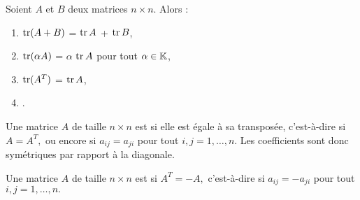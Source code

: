 \documentclass[10pt,class=article,crop=false]{standalone}
\begin{document}
\begin{multicols}{2}
\begin{theoreme}
	Soient $A$ et $B$ deux matrices $n \times n$. Alors :
	\begin{enumerate}
		\item $\operatorname{tr}(A + B)$ = $\operatorname{tr} A$ + $\operatorname{tr} B$,
		\item $\operatorname{tr}(\alpha A)$ = $\alpha$ $\operatorname{tr} A$ pour tout $\alpha \in \mathbb{K}$,
		\item $\operatorname{tr}(A^T)$ = $\operatorname{tr} A $,
		\item {}.
	\end{enumerate}
\end{theoreme}




\begin{definition}
	Une matrice $A$ de taille $n \times n$ est  si elle est égale
	à sa transposée, c'est-à-dire si
	$A = A^T,$
	ou encore si $a_{ij}=a_{ji}$ pour tout $i,j=1, \ldots, n$.
	Les coefficients sont donc symétriques par rapport à la diagonale.
\end{definition}



\begin{definition}
	Une matrice $A$ de taille $n \times n$ est  si
	$A^T = -A,$
	c'est-à-dire si $a_{ij} = -a_{ji}$ pour tout $i,j=1, \ldots, n.$
\end{definition}



\end{multicols}
\end{document}
